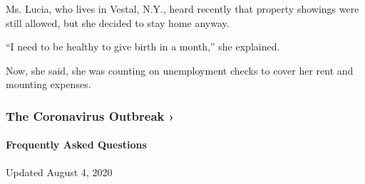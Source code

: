 Ms. Lucia, who lives in Vestal, N.Y., heard recently that property
showings were still allowed, but she decided to stay home anyway.

``I need to be healthy to give birth in a month,'' she explained.

Now, she said, she was counting on unemployment checks to cover her rent
and mounting expenses.

\href{https://www.nytimes3xbfgragh.onion/news-event/coronavirus?action=click\&pgtype=Article\&state=default\&region=MAIN_CONTENT_3\&context=storylines_faq}{}

\hypertarget{the-coronavirus-outbreak-}{%
\subsubsection{The Coronavirus Outbreak
›}\label{the-coronavirus-outbreak-}}

\hypertarget{frequently-asked-questions}{%
\paragraph{Frequently Asked
Questions}\label{frequently-asked-questions}}

Updated August 4, 2020

